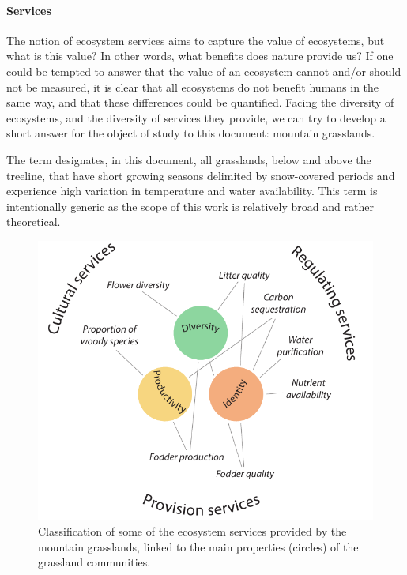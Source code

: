 \paragraph{Services}
The notion of ecosystem services aims to capture the value of ecosystems, but what is this value? In other words, what benefits does nature provide us? If one could be tempted to answer that the value of an ecosystem cannot and/or should not be measured, it is clear that all ecosystems do not benefit humans in the same way, and that these differences could be quantified. Facing the diversity of ecosystems, and the diversity of services they provide, we can try to develop a short answer for the object of study to this document: mountain grasslands.

The term  designates, in this document, all grasslands, below and above the treeline, that have short growing seasons delimited by snow-covered periods and experience high variation in temperature and water availability. This term is intentionally generic as the scope of this work is relatively broad and rather theoretical.

\begin{figure}
    \includegraphics[width=1\linewidth]{./1_Introduction/graphics/services.pdf}
  \caption[Ecosystem services in mountain grasslands]{Classification of some of the ecosystem services provided by the mountain grasslands, linked to the main properties (circles) of the grassland communities. }
  \label{fig:services}
\end{figure}

